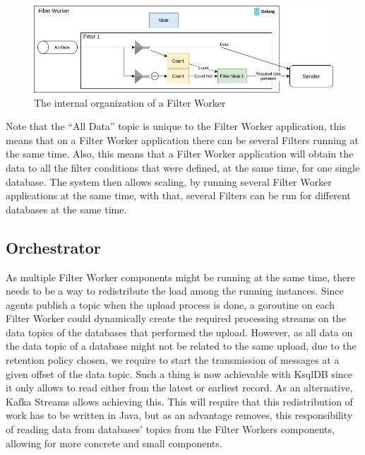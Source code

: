 \begin{figure}[H]
    \center
    \includegraphics[width=\textwidth]{filter-workers}
    \caption{The internal organization of a Filter Worker}
    \label{fig:filter-workers}
\end{figure}

Note that the ``All Data'' topic is unique to the Filter Worker application, this means that on a Filter Worker application there can be several Filters running at the same time.
Also, this means that a Filter Worker application will obtain the data to all the filter conditions that were defined, at the same time, for one single database.
The system then allows scaling, by running several Filter Worker applications at the same time, with that, several Filters can be run for different databases at the same time.

\subsection{Orchestrator}

As multiple Filter Worker components might be running at the same time, there needs to be a way to redistribute the load among the running instances.
Since agents publish a topic when the upload process is done, a goroutine on each Filter Worker could dynamically create the required processing streams on the data topics of the databases that performed the upload.
However, as all data on the data topic of a database might not be related to the same upload, due to the retention policy chosen, we require to start the transmission of messages at a given offset of the data topic.
Such a thing is now achievable with KsqlDB since it only allows to read either from the latest or earliest record.
As an alternative, Kafka Streams allows achieving this.
This will require that this redistribution of work has to be written in Java, but as an advantage removes, this responsibility of reading data from databases' topics from the Filter Workers components, allowing for more concrete and small components.


